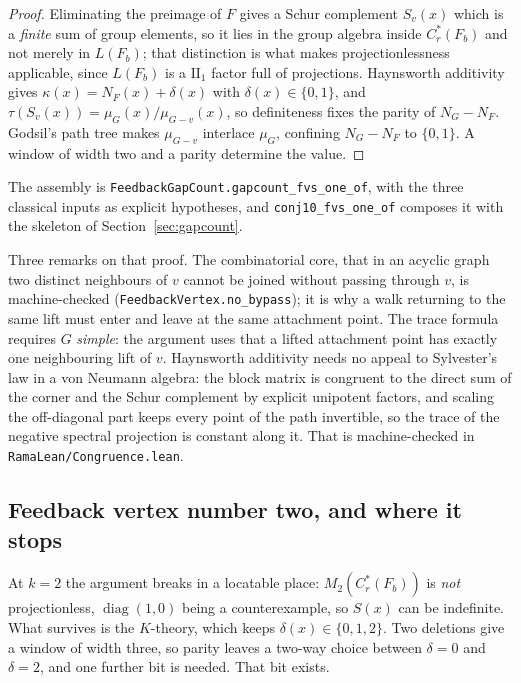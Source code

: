 \documentclass[11pt]{article}
\theoremstyle{remark}
\begin{document}
\begin{proof}
Eliminating the preimage of $F$ gives a Schur complement $S_v(x)$ which is a \emph{finite}
sum of group elements, so it lies in the group algebra inside $C^*_r(F_b)$ and not merely in
$L(F_b)$; that distinction is what makes projectionlessness applicable, since $L(F_b)$ is a
$\mathrm{II}_1$ factor full of projections. Haynsworth additivity gives
$\kappa(x)=N_F(x)+\delta(x)$ with $\delta(x)\in\{0,1\}$, and
$\tau(S_v(x))=\mu_G(x)/\mu_{G-v}(x)$, so definiteness fixes the parity of $N_G-N_F$. Godsil's
path tree makes $\mu_{G-v}$ interlace $\mu_G$, confining $N_G-N_F$ to $\{0,1\}$. A window of
width two and a parity determine the value.
\end{proof}

The assembly is \texttt{FeedbackGapCount.gapcount\_fvs\_one\_of}, with the three classical
inputs as explicit hypotheses, and \texttt{conj10\_fvs\_one\_of} composes it with the
skeleton of Section~\ref{sec:gapcount}.

Three remarks on that proof. The combinatorial core, that in an acyclic graph two distinct
neighbours of $v$ cannot be joined without passing through $v$, is machine-checked
(\texttt{FeedbackVertex.no\_bypass}); it is why a walk returning to the same lift must enter
and leave at the same attachment point. The trace formula requires $G$ \emph{simple}: the
argument uses that a lifted attachment point has exactly one neighbouring lift of $v$.
Haynsworth additivity needs no appeal to Sylvester's law in a von Neumann algebra: the block
matrix is congruent to the direct sum of the corner and the Schur complement by explicit
unipotent factors, and scaling the off-diagonal part keeps every point of the path
invertible, so the trace of the negative spectral projection is constant along it. That is
machine-checked in \texttt{RamaLean/Congruence.lean}.

\subsection{Feedback vertex number two, and where it stops}

At $k=2$ the argument breaks in a locatable place: $M_2(C^*_r(F_b))$ is \emph{not}
projectionless, $\operatorname{diag}(1,0)$ being a counterexample, so $S(x)$ can be
indefinite. What survives is the $K$-theory, which keeps $\delta(x)\in\{0,1,2\}$. Two
deletions give a window of width three, so parity leaves a two-way choice between
$\delta=0$ and $\delta=2$, and one further bit is needed. That bit exists.
\end{document}
